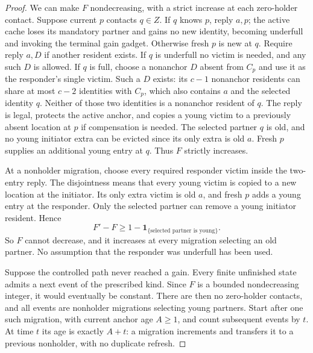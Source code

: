\documentclass[11pt]{article}
\begin{document}
\begin{proof}
We can make $F$ nondecreasing, with a strict increase
at each zero-holder contact. Suppose current $p$
contacts $q\in Z$. If $q$ knows $p$, reply $a,p$;
the active cache loses its mandatory partner and gains
no new identity, becoming underfull and invoking the
terminal gain gadget. Otherwise fresh $p$ is new at $q$.
Require reply $a,D$ if another resident exists.
If $q$ is underfull no victim is needed, and any such
$D$ is allowed. If $q$ is full, choose a nonanchor
$D$ absent from $C_p$ and use it as the responder's
single victim. Such a $D$ exists: its $c-1$ nonanchor
residents can share at most $c-2$ identities with $C_p$,
which also contains $a$ and the selected identity $q$.
Neither of those two identities is a nonanchor resident
of $q$. The reply is legal, protects the active anchor,
and copies a young victim to a previously absent
location at $p$ if compensation is needed. The selected
partner $q$ is old, and no young initiator extra can
be evicted since its only extra is old $a$.
Fresh $p$ supplies an additional young entry at $q$.
Thus $F$ strictly increases.

At a nonholder migration, choose every required
responder victim inside the two-entry reply. The
disjointness means that every young victim is copied
to a new location at the initiator. Its only extra
victim is old $a$, and fresh $p$ adds a young entry
at the responder. Only the selected partner can
remove a young initiator resident. Hence
\[
 F'-F\ge1-\mathbf1_{\{\text{selected partner is young}\}}.
\]
So $F$ cannot decrease, and it increases at every
migration selecting an old partner. No assumption
that the responder was underfull has been used.

Suppose the controlled path never reached a gain.
Every finite unfinished state admits a next event
of the prescribed kind. Since $F$ is a bounded
nondecreasing integer, it would eventually be constant.
There are then no zero-holder contacts, and all events
are nonholder migrations selecting young partners.
Start after one such migration, with current anchor
age $A\ge1$, and count subsequent events by $t$.
At time $t$ its age is exactly $A+t$: a migration
increments and transfers it to a previous nonholder,
with no duplicate refresh.


\end{proof}
\end{document}
